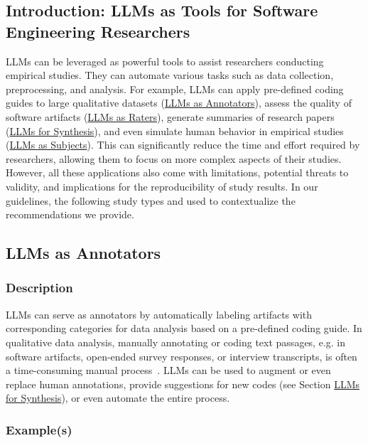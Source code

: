 \documentclass[11pt]{article}
\begin{document}
\subsection{Introduction: LLMs as Tools for Software Engineering Researchers}

LLMs can be leveraged as powerful tools to assist researchers conducting empirical studies.
They can automate various tasks such as data collection, preprocessing, and analysis.
For example, LLMs can apply pre-defined coding guides to large qualitative datasets (\href{/study-types/#llms-as-annotators}{LLMs as Annotators}), assess the quality of software artifacts (\href{/study-types/#llms-as-raters}{LLMs as Raters}), generate summaries of research papers (\href{/study-types/#llms-for-synthesis}{LLMs for Synthesis}), and even simulate human behavior in empirical studies (\href{/study-types/#llms-as-subjects}{LLMs as Subjects}).
This can significantly reduce the time and effort required by researchers, allowing them to focus on more complex aspects of their studies.
However, all these applications also come with limitations, potential threats to validity, and implications for the reproducibility of study results.
In our guidelines, the following study types and used to contextualize the recommendations we provide.


\subsection{LLMs as Annotators}

\subsubsection{Description}

LLMs can serve as annotators by automatically labeling artifacts with corresponding categories for data analysis based on a pre-defined coding guide.
In qualitative data analysis, manually annotating or coding text passages, e.g. in software artifacts, open-ended survey responses, or interview transcripts, is often a time-consuming manual process~\cite{DBLP:journals/ase/BanoHZT24}.
LLMs can be used to augment or even replace human annotations, provide suggestions for new codes (see Section \href{/study-types/#llms-for-synthesis}{LLMs for Synthesis}), or even automate the entire process.

\subsubsection{Example(s)}
\end{document}
